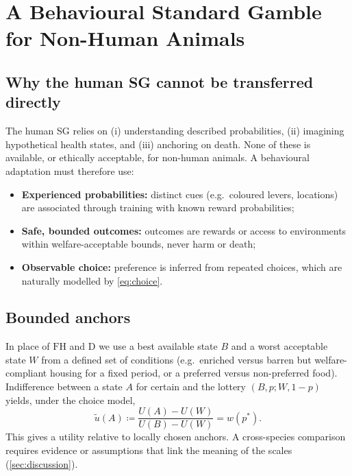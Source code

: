 \documentclass[11pt,a4paper]{article}
\begin{document}
\section{A Behavioural Standard Gamble for Non-Human Animals}
\label{sec:behavioural}

\subsection{Why the human SG cannot be transferred directly}

The human SG relies on (i) understanding described probabilities, (ii) imagining hypothetical health states, and (iii) anchoring on death. None of these is available, or ethically acceptable, for non-human animals. A behavioural adaptation must therefore use:
\begin{itemize}[leftmargin=*]
  \item \textbf{Experienced probabilities:} distinct cues (e.g.\ coloured levers, locations) are associated through training with known reward probabilities;
  \item \textbf{Safe, bounded outcomes:} outcomes are rewards or access to environments within welfare-acceptable bounds, never harm or death;
  \item \textbf{Observable choice:} preference is inferred from repeated choices, which are naturally modelled by \cref{eq:choice}.
\end{itemize}

\subsection{Bounded anchors}

In place of $\mathrm{FH}$ and $\mathrm{D}$ we use a best available state $B$ and a worst acceptable state $W$ from a defined set of conditions (e.g.\ enriched versus barren but welfare-compliant housing for a fixed period, or a preferred versus non-preferred food). Indifference between a state $A$ for certain and the lottery $(B,p;W,1-p)$ yields, under the choice model,
\begin{equation}
  \tilde u(A) \coloneqq \frac{U(A)-U(W)}{U(B)-U(W)} = w(p^\ast).
  \label{eq:bounded}
\end{equation}
This gives a utility relative to locally chosen anchors. A cross-species comparison requires evidence or assumptions that link the meaning of the scales (\cref{sec:discussion}).
\end{document}
